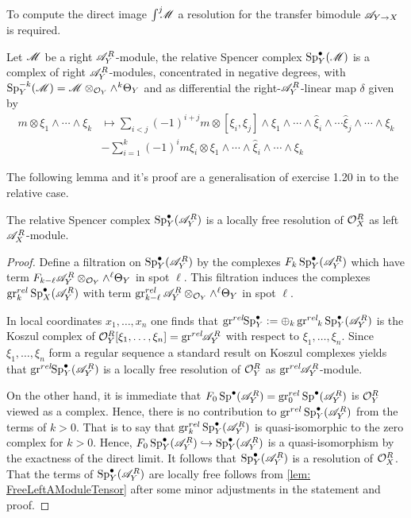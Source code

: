     To compute the direct image $\int^j \mkern -8mu \mathscr{M}$ a resolution for the transfer bimodule $\mathscr{A}_{Y\to X}$ is required.
    \begin{definition}
        Let $\mathscr{M}$ be a right $\mathscr{A}_Y^R$-module, the relative Spencer complex $\operatorname{Sp}_Y^\bullet(\mathscr{M})$ is a complex of right $\mathscr{A}_Y^R$-modules, concentrated in negative degrees, with $\operatorname{Sp}_Y^{-k}(\mathscr{M}) = \mathscr{M} \otimes_{\mathcal{O}_Y} \wedge^{k}\Theta_Y$ and as differential the right-$\mathscr{A}_Y^R$-linear map $\delta$ given by
        \begin{align*}
            m\otimes \xi_1 \wedge \cdots \wedge \xi_k &\mapsto \sum_{i<j}(-1)^{i+j} m \otimes [\xi_i,\xi_j]\wedge \xi_1 \wedge \cdots \wedge \widehat{\xi}_i \wedge\cdots \widehat{\xi}_j \wedge \cdots \wedge \xi_k\\
            &- \sum_{i=1}^k (-1)^{i} m\xi_i \otimes \xi_1 \wedge \cdots \wedge \widehat{\xi}_i\wedge \cdots \wedge \xi_k
        \end{align*}
    \end{definition}
    The following lemma and it's proof are a generalisation of exercise 1.20 in \cite{sabbah2011introduction} to the relative case.
    \begin{lemma}\label{lem: RelativeSpencerResolvesOXR}
      The relative Spencer complex $\operatorname{Sp}_Y^\bullet(\mathscr{A}_Y^R)$ is a locally free resolution of $\mathcal{O}_X^R$ as left $\mathscr{A}_X^R$-module.
    \end{lemma}
    \begin{proof}
      Define a filtration on $\operatorname{Sp}_Y^\bullet(\mathscr{A}_Y^R)$ by the complexes $F_k\operatorname{Sp}_Y^\bullet(\mathscr{A}_Y^R)$ which have term $F_{k-\ell}\mathscr{A}_Y^R\otimes_{\mathcal{O}_Y}\wedge^\ell \Theta_Y$ in spot $\ell$.
      This filtration induces the complexes $\operatorname{gr}_k^{rel} \operatorname{Sp}_X^\bullet(\mathscr{A}_Y^R)$ with term  $\operatorname{gr}_{k-\ell}^{rel}\mathscr{A}_Y^R\otimes_{\mathcal{O}_Y}\wedge^\ell \Theta_Y$ in spot $\ell$.

      In local coordinates $x_1,\ldots, x_n$ one finds that $\operatorname{gr}^{rel}\mkern-5mu\operatorname{Sp}_Y^\bullet := \oplus_k \operatorname{gr}^{rel}\mkern-5mu_k \operatorname{Sp}_Y^\bullet(\mathscr{A}_Y^R)$ is the Koszul complex of $\mathcal{O}_Y^R[\xi_1,\ldots,\xi_n] = \operatorname{gr}^{rel}\mkern-5mu \mathscr{A}_Y^R$ with respect to  $\xi_1,\ldots, \xi_n$.
      Since $\xi_1,\ldots,\xi_n$ form a regular sequence a standard result on Koszul complexes yields that $\operatorname{gr}^{rel}\mkern-5mu\operatorname{Sp}_Y^\bullet(\mathscr{A}_Y^R)$ is a locally free resolution of $\mathcal{O}_Y^R$ as $\operatorname{gr}^{rel}\mkern-5mu \mathscr{A}_Y^R$-module.

      On the other hand, it is immediate that $F_0 \operatorname{Sp}^\bullet(\mathscr{A}_Y^R) = \operatorname{gr}_0^{rel}\operatorname{Sp}^\bullet(\mathscr{A}_Y^R)$ is  $\mathcal{O}_Y^R$ viewed as a complex. Hence, there is no contribution to $\operatorname{gr}^{rel}\operatorname{Sp}_Y^\bullet(\mathscr{A}_Y^R)$ from the terms of $k>0$.
      That is to say that $\operatorname{gr}_k^{rel}\operatorname{Sp}_Y^\bullet(\mathscr{A}_Y^R)$ is quasi-isomorphic to the zero complex for $k>0$.
      Hence, $F_0\operatorname{Sp}_Y^\bullet(\mathscr{A}_Y^R)\hookrightarrow \operatorname{Sp}_Y^\bullet(\mathscr{A}_Y^R)$ is a quasi-isomorphism by the exactness of the direct limit.
      It follows that  $\operatorname{Sp}_Y^\bullet(\mathscr{A}_Y^R)$ is a resolution of $\mathcal{O}_X^R$.
      That the terms of $\operatorname{Sp}_Y^\bullet(\mathscr{A}_Y^R)$ are locally free follows from \cref{lem: FreeLeftAModuleTensor} after some minor adjustments in the statement and proof.
    \end{proof}

